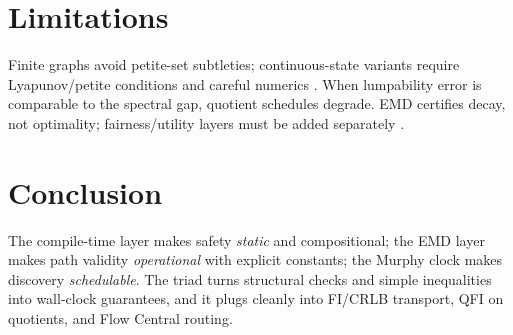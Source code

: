 \documentclass[11pt]{article}
\newcommand{\1}{\mathbbm{1}}
\begin{document}
\section{Limitations}\label{sec:limits}
Finite graphs avoid petite-set subtleties; continuous-state variants require Lyapunov/petite conditions and careful numerics \parencite{MeynTweedie2009,HairerMattingly2011}. When lumpability error is comparable to the spectral gap, quotient schedules degrade. EMD certifies decay, not optimality; fairness/utility layers must be added separately \parencite{Altman1999,Puterman1994}.

\section{Conclusion}\label{sec:conclusion}
The compile-time layer makes safety \emph{static} and compositional; the EMD layer makes path validity \emph{operational} with explicit constants; the Murphy clock makes discovery \emph{schedulable}. The triad turns structural checks and simple inequalities into wall-clock guarantees, and it plugs cleanly into FI/CRLB transport, QFI on quotients, and Flow Central routing.

\printbibliography
\end{document}
